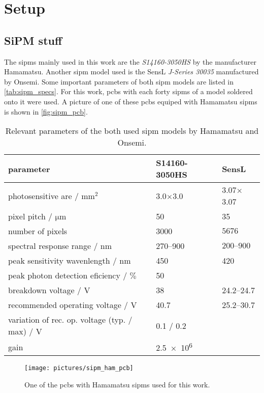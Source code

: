 \chapter{Setup}

\section{SiPM stuff}
The \acp{sipm} mainly used in this work are the \textit{S14160-3050HS} by the manufacturer Hamamatsu.
Another \ac{sipm} model used is the SensL \textit{J-Series 30035} manufactured by Onsemi.
Some important parameters of both \ac{sipm} models are listed in \autoref{tab:sipm_specs}.
For this work, \acp{pcb} with each forty \acp{sipm} of a model soldered onto it were used.
A picture of one of these \acp{pcb} equiped with Hamamatsu \acp{sipm} is shown in \autoref{fig:sipm_pcb}.

\begin{table}
	\centering
	\caption[SiPM parameters]{Relevant parameters of the both used \ac{sipm} models by Hamamatsu and Onsemi. \cite{}}
	\label{tab:sipm_specs}
	\renewcommand{\arraystretch}{1.3}
	\begin{tabularx}{\textwidth}{Xp{}p{}}
	    \toprule
	    parameter								& S14160-3050HS		& SensL			\\\midrule
	    photosensitive are / $\si{\milli\meter\squared}$			& 3.0$\times$3.0	& 3.07$\times$3.07	\\
	    pixel pitch / $\si{\micro\meter}$					& 50			& 35			\\
	    number of pixels							& 3000			& $\num{5676}$		\\
	    spectral response range / $\si{\nano\meter}$			& \numrange{270}{900}	& $\numrange{200}{900}$	\\
	    peak sensitivity wavenlength / $\si{\nano\meter}$			& 450			& 420			\\
	    peak photon detection eficiency / $\si{\percent}$			& 50			& 			\\
	    breakdown voltage / $\si{\volt}$					& 38			& \numrange{24.2}{24.7}	\\
	    recommended operating voltage / $\si{\volt}$			& 40.7			& \numrange{25.2}{30.7}	\\
	    variation of rec. op. voltage (typ. / max) / $\si{\volt}$		& 0.1 / 0.2		&			\\
	    gain								& \num{2.5e6}		&			\\
	    \bottomrule
	\end{tabularx}
	\renewcommand{\arraystretch}{1}
\end{table} 
\begin{figure}
	\centering
	\texttt{[image: pictures/sipm\_ham\_pcb]}
	\caption[\ac{pcb} with Hamamatsu \acp{sipm}]{One of the \acp{pcb} with Hamamatsu \acp{sipm} used for this work.}
	\label{fig:sipm_pcb}
\end{figure}

